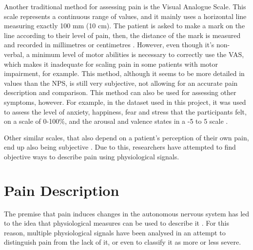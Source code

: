 Another traditional method for assessing pain is the Visual Analogue Scale. This scale represents a continuous range of values, and it mainly uses a horizontal line measuring exactly 100 mm (10 cm). The patient is asked to make a mark on the line according to their level of pain, then, the distance of the mark is measured and recorded in millimetres or centimetres \cite{Bielewicz2022}. However, even though it’s non-verbal, a minimum level of motor abilities is necessary to correctly use the VAS, which makes it inadequate for scaling pain in some patients with motor impairment, for example. This method, although it seems to be more detailed in values than the NPS, is still very subjective, not allowing for an accurate pain description and comparison. This method can also be used for assessing other symptoms, however. For example, in the dataset used in this project, it was used to assess the level of anxiety, happiness, fear and stress that the participants felt, on a scale of 0-100\%, and the arousal and valence states in a -5 to 5 scale \cite{Alves2024}.

Other similar scales, that also depend on a patient's perception of their own pain, end up also being subjective \cite{Adeboye2021}\cite{Robinson2024}. Due to this, researchers have attempted to find objective ways to describe pain using physiological signals.


\section{Pain Description}

The premise that pain induces changes in the autonomous nervous system has led to the idea that physiological measures can be used to describe it \cite{Rojas2023}. For this reason, multiple physiological signals have been analysed in an attempt to distinguish pain from the lack of it, or even to classify it as more or less severe.





